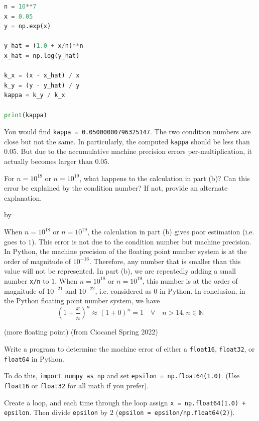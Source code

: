 \documentclass[12pt,letterpaper,answers]{exam}
\makeatletter
\def\SetTotalwidth{\advance\linewidth by \@totalleftmargin
\@totalleftmargin=0pt}
\makeatother
\begin{document}
\begin{questions}
\begin{parts}
\begin{solution}
\begin{lstlisting}[language=Python]
n = 10**7
x = 0.05
y = np.exp(x)

y_hat = (1.0 + x/n)**n
x_hat = np.log(y_hat)

k_x = (x - x_hat) / x
k_y = (y - y_hat) / y
kappa = k_y / k_x

print(kappa)
\end{lstlisting}
You would find \texttt{kappa = 0.05000000796325147}. The two condition numbers are close but not the same. In particularly, the computed \texttt{kappa} should be less than $0.05$. But due to the accumulative machine precision errors per-multiplication, it actually becomes larger than $0.05$.
\end{solution}

For $n = 10^{18}$ or $n = 10^{19}$, what happens to the calculation in part (b)?  Can this error be explained by the condition number?  If not, provide an alternate explanation.

\SetTotalwidth
\begin{solution}
When $n = 10^{18}$ or $n = 10^{19}$, the calculation in part (b) gives poor estimation (i.e. goes to $1$). This error is not due to the condition number but machine precision. In Python, the machine precision of the floating point number system is at the order of magnitude of $10^{-16}$. Therefore, any number that is smaller than this value will not be represented. In part (b), we are repeatedly adding a small number \texttt{x/n} to $1$. When $n = 10^{18}$ or $n = 10^{19}$, this number is at the order of magnitude of $10^{-21}$ and $10^{-22}$, i.e. considered as $0$ in Python. In conclusion, in the Python floating point number system, we have
$$\left(1+\frac{x}{n}\right)^n \approx \left(1+0\right)^n = 1 \quad\forall\quad n>14, n\in\mathbb{N}$$
\end{solution}

\end{parts}

\question (more floating point) (from Ciocanel Spring 2022)
\begin{parts}
\item 
 Write a program to determine the machine error of either a \texttt{float16}, \texttt{float32}, or \texttt{float64} in Python.

To do this, \texttt{import numpy as np} and set \texttt{epsilon = np.float64(1.0)}.  (Use \texttt{float16} or \texttt{float32} for all math if you prefer).

Create a loop, and each time through the loop assign \texttt{x = np.float64(1.0) + epsilon}.  Then divide \texttt{epsilon} by $2$ (\texttt{epsilon = epsilon/np.float64(2)}).


\end{parts}
\end{questions}
\end{document}
